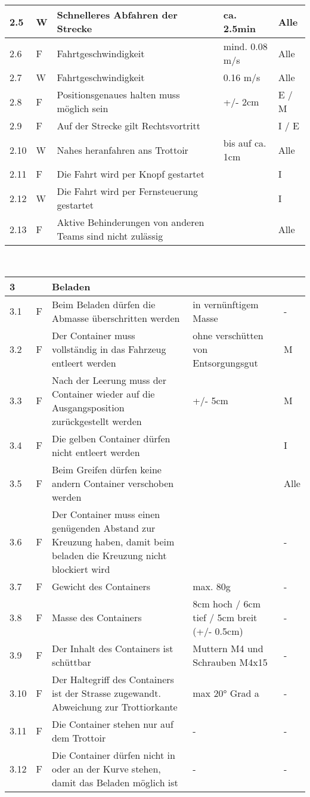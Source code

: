 \begin{center}
\begin{tabular}{|p{1cm}|p{0.5cm}|p{5cm}|p{5cm}|p{1.5cm}|}
 2.5 & W & Schnelleres Abfahren der Strecke & ca. 2.5min & Alle\\\hline
 2.6 & F & Fahrtgeschwindigkeit & mind. 0.08 m/s & Alle \\\hline
 2.7 & W & Fahrtgeschwindigkeit & 0.16 m/s & Alle \\\hline
 2.8 & F & Positionsgenaues halten muss möglich sein & +/- 2cm & E / M\\\hline
 2.9 & F & Auf der Strecke gilt Rechtsvortritt & & I / E \\\hline
 2.10 & W & Nahes heranfahren ans Trottoir & bis auf ca. 1cm & Alle\\\hline
 2.11 & F & Die Fahrt wird per Knopf gestartet & & I\\\hline
 2.12 & W & Die Fahrt wird per Fernsteuerung gestartet & & I \\\hline
 2.13 & F & Aktive Behinderungen von anderen Teams sind nicht zulässig & & Alle \\\hline
\end{tabular}\\[0.3cm]
\begin{tabular}{|p{1cm}|p{0.5cm}|p{5cm}|p{5cm}|p{1.5cm}|}\hline
 \textbf{3} & & \textbf{Beladen} & & \\\hline
 3.1 & F & Beim Beladen dürfen die Abmasse überschritten werden & in vernünftigem Masse & -\\\hline
 3.2 & F & Der Container muss vollständig in das Fahrzeug entleert werden & ohne verschütten von Entsorgungsgut & M\\\hline
 3.3 & F & Nach der Leerung muss der Container wieder auf die Ausgangsposition zurückgestellt werden & +/- 5cm & M\\\hline
 3.4 & F & Die gelben Container dürfen nicht entleert werden & & I\\\hline
 3.5 & F & Beim Greifen dürfen keine andern Container verschoben werden & & Alle\\\hline
 3.6 & F & Der Container muss einen genügenden Abstand zur Kreuzung haben, damit beim beladen die Kreuzung nicht blockiert wird & & - \\\hline 
 3.7 & F & Gewicht des Containers & max. 80g & - \\\hline 
 3.8 & F & Masse des Containers& 8cm hoch  / 6cm tief / 5cm breit (+/- 0.5cm) & - \\\hline 
 3.9 & F & Der Inhalt des Containers ist schüttbar & Muttern M4 und Schrauben M4x15  & - \\\hline 
 3.10 & F & Der Haltegriff des Containers ist der Strasse zugewandt. Abweichung zur Trottiorkante & max 20° Grad a  & - \\\hline 
 3.11 & F & Die Container stehen nur auf dem Trottoir & - & - \\\hline 
 3.12 & F & Die Container dürfen nicht in oder an der Kurve stehen, damit das Beladen möglich ist & - & - \\\hline 
\end{tabular}
\end{center}
